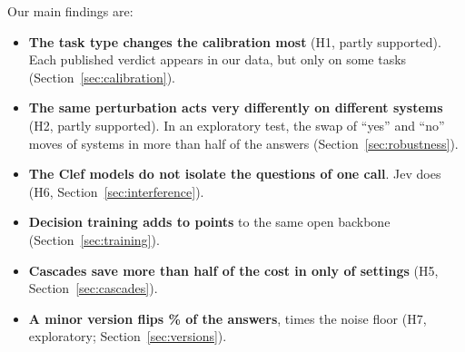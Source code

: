 \documentclass[11pt]{article}
\begin{document}
Our main findings are:
\begin{itemize}
\setlength\itemsep{0pt}
\item \textbf{The task type changes the calibration most} (H1, partly supported). Each published verdict appears in our data, but only on some tasks (Section~\ref{sec:calibration}).
\item \textbf{The same perturbation acts very differently on different systems} (H2, partly supported). In an exploratory test, the swap of ``yes'' and ``no'' moves \nNameswapOverHalf{} of \nNameswapTested{} systems in more than half of the answers (Section~\ref{sec:robustness}).
\item \textbf{The Clef models do not isolate the questions of one call}. Jev does (H6, Section~\ref{sec:interference}).
\item \textbf{Decision training adds \gainRangeMin{} to \gainRangeMax{} points} to the same open backbone (Section~\ref{sec:training}).
\item \textbf{Cascades save more than half of the cost in only \nCascadeKeptCheap{} of \nCascadeBetter{} settings} (H5, Section~\ref{sec:cascades}).
\item \textbf{A minor version flips \flipVersion\% of the answers}, \versionOverNoise{} times the noise floor (H7, exploratory; Section~\ref{sec:versions}).
\end{itemize}
\end{document}
